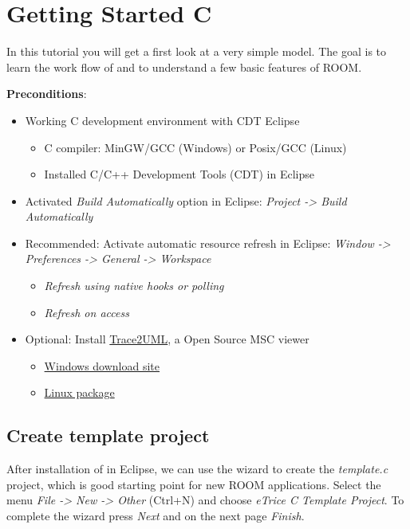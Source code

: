 \section{Getting Started C}

In this tutorial you will get a first look at a very simple \eTrice{} model. The goal is to learn the work flow of \eTrice{} and to understand a few basic features of ROOM.

\textbf{Preconditions}:
\begin{itemize}
	\item Working C development environment with CDT Eclipse
	\begin{itemize}
		\item C compiler: MinGW/GCC (Windows) or Posix/GCC (Linux)
		\item Installed C/C++ Development Tools (CDT) in Eclipse
	\end{itemize}
	\item Activated \emph{Build Automatically} option in Eclipse: \emph{Project -> Build Automatically}
	\item Recommended: Activate automatic resource refresh in Eclipse: \emph{Window -> Preferences -> General -> Workspace}
	\begin{itemize}
		\item \emph{Refresh using native hooks or polling}
		\item \emph{Refresh on access}
	\end{itemize}
	\item Optional: Install \href{http://trace2uml.stage.tigris.org/}{Trace2UML}, a Open Source MSC viewer
	\begin{itemize}
		\item \href{http://trace2uml.tigris.org/servlets/ProjectDocumentList?folderID=6208}{Windows download site}
		\item \href{http://apt.astade.de/}{Linux package}
	\end{itemize}

\end{itemize}

\subsection{Create template project}
After installation of \eTrice in Eclipse, we can use the wizard to create the \emph{template.c} project, which is good starting point for new ROOM applications. Select the menu \emph{File -> New -> Other} (Ctrl+N) and choose \emph{eTrice C Template Project}. To complete the wizard press \emph{Next} and on the next page \emph{Finish}.


